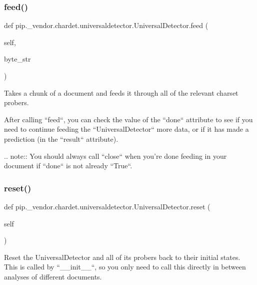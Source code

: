 \subsubsection{\texorpdfstring{feed()}{feed()}}
{\footnotesize\ttfamily def pip.\+\_\+vendor.\+chardet.\+universaldetector.\+Universal\+Detector.\+feed (\begin{DoxyParamCaption}\item[{}]{self,  }\item[{}]{byte\+\_\+str }\end{DoxyParamCaption})}

\begin{DoxyVerb}Takes a chunk of a document and feeds it through all of the relevant
charset probers.

After calling ``feed``, you can check the value of the ``done``
attribute to see if you need to continue feeding the
``UniversalDetector`` more data, or if it has made a prediction
(in the ``result`` attribute).

.. note::
   You should always call ``close`` when you're done feeding in your
   document if ``done`` is not already ``True``.
\end{DoxyVerb}
 \mbox{\label{classpip_1_1__vendor_1_1chardet_1_1universaldetector_1_1UniversalDetector_afce2e9be4f989e238a55e2e9eb34c225}} 
\subsubsection{\texorpdfstring{reset()}{reset()}}
{\footnotesize\ttfamily def pip.\+\_\+vendor.\+chardet.\+universaldetector.\+Universal\+Detector.\+reset (\begin{DoxyParamCaption}\item[{}]{self }\end{DoxyParamCaption})}

\begin{DoxyVerb}Reset the UniversalDetector and all of its probers back to their
initial states.  This is called by ``__init__``, so you only need to
call this directly in between analyses of different documents.
\end{DoxyVerb}
 

